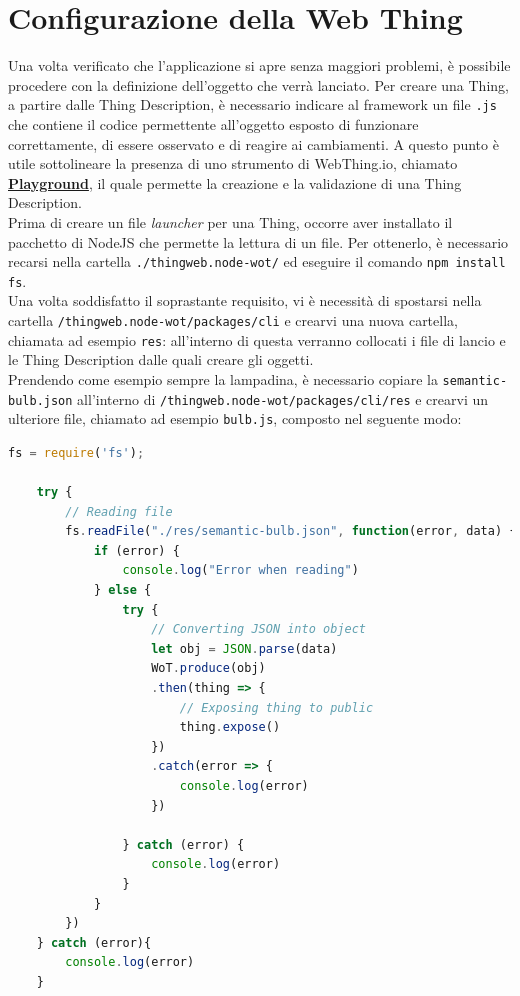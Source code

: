 \documentclass[12pt,a4paper,openright,oneside]{report}
\begin{document}
\section{Configurazione della Web Thing}
\label{sec:configuring:wt}
Una volta verificato che l'applicazione si apre senza maggiori problemi, è possibile procedere con la definizione dell'oggetto che verrà lanciato. Per creare una Thing, a partire dalle Thing Description, è necessario indicare al framework un file \texttt{.js} che contiene il codice permettente all'oggetto esposto di funzionare correttamente, di essere osservato e di reagire ai cambiamenti. A questo punto è utile sottolineare la presenza di uno strumento di WebThing.io, chiamato \href{http://plugfest.thingweb.io/playground/}{\textbf{Playground}}, il quale permette la creazione e la validazione di una Thing Description.\\

Prima di creare un file \textit{launcher} per una Thing, occorre aver installato il pacchetto di NodeJS che permette la lettura di un file. Per ottenerlo, è necessario recarsi nella cartella \texttt{./thingweb.node-wot/} ed eseguire il comando \texttt{npm install fs}.\\

Una volta soddisfatto il soprastante requisito, vi è necessità di spostarsi nella cartella \texttt{/thingweb.node-wot/packages/cli} e crearvi una nuova cartella, chiamata ad esempio \texttt{res}: all'interno di questa verranno collocati i file di lancio e le Thing Description dalle quali creare gli oggetti.\\

Prendendo come esempio sempre la lampadina, è necessario copiare la \texttt{semantic-bulb.json} all'interno di \texttt{/thingweb.node-wot/packages/cli/res} e crearvi un ulteriore file, chiamato ad esempio \texttt{bulb.js}, composto nel seguente modo:
\begin{lstlisting}[language=JavaScript]
	fs = require('fs');
	
	try {
		// Reading file
		fs.readFile("./res/semantic-bulb.json", function(error, data) {
			if (error) {
				console.log("Error when reading")
			} else {
				try {
					// Converting JSON into object
					let obj = JSON.parse(data)
					WoT.produce(obj)
					.then(thing => {
						// Exposing thing to public
						thing.expose()
					})
					.catch(error => {
						console.log(error)
					})
					
				} catch (error) {
					console.log(error)
				}
			}
		})
	} catch (error){
		console.log(error)
	}
\end{lstlisting}
\end{document}
